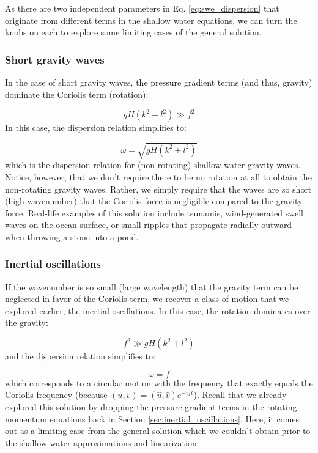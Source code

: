 \documentclass[12pt]{article}
\numberwithin{equation}{section}
\numberwithin{figure}{section}
\numberwithin{table}{section}
\begin{document}
As there are two independent parameters in Eq. \ref{eq:swe_dispersion} that
originate from different terms in the shallow water equations, we can turn the
knobs on each to explore some limiting cases of the general solution.

\subsubsection{Short gravity waves}

In the case of short gravity waves, the pressure gradient terms (and thus,
gravity) dominate the Coriolis term (rotation):

\begin{equation}
  gH(k^2 + l^2) \gg f^2
\end{equation}
In this case, the dispersion relation simplifies to:

\begin{equation}
  \omega = \sqrt{gH(k^2 + l^2)}
\end{equation}
which is the dispersion relation for (non-rotating) shallow water gravity waves.
Notice, however, that we don't require there to be no rotation at all to obtain
the non-rotating gravity waves.
Rather, we simply require that the waves are so short (high wavenumber) that the
Coriolis force is negligible compared to the gravity force.
Real-life examples of this solution include tsunamis, wind-generated swell
waves on the ocean surface, or small ripples that propagate radially outward
when throwing a stone into a pond.

\subsubsection{Inertial oscillations}

If the wavenumber is so small (large wavelength) that the gravity term can be
neglected in favor of the Coriolis term, we recover a class of motion that we
explored earlier, the inertial oscillations.
In this case, the rotation dominates over the gravity:

\begin{equation}
  f^2 \gg gH(k^2 + l^2)
\end{equation}
and the dispersion relation simplifies to:

\begin{equation}
  \omega = f
\end{equation}
which corresponds to a circular motion with the frequency that exactly equals
the Coriolis frequency (because $(u, v) = (\widehat{u}, \widehat{v}) e^{- i f t}$).
Recall that we already explored this solution by dropping the pressure gradient
terms in the rotating momentum equations back in Section
\ref{sec:inertial_oscillations}.
Here, it comes out as a limiting case from the general solution which we
couldn't obtain prior to the shallow water approximations and linearization.
\end{document}
